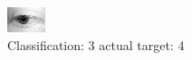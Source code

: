 \begin{figure}[h!]
\begin{center}
\includegraphics[width=0.60\columnwidth]{figures/ID2577_class_3_target_4.png}
\end{center}
\caption{ Classification: 3 actual target: 4}
\label{fig:ID2577_class_3_target_4}
\end{figure}

